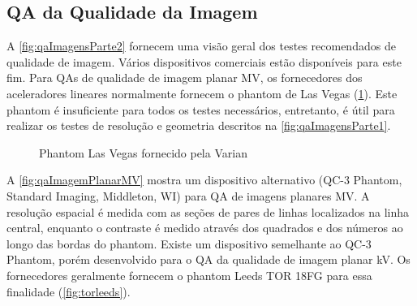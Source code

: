 \documentclass[11pt,a4paper]{article}
\begin{document}
\subsection*{QA da Qualidade da Imagem}

    A \ref{fig:qaImagensParte2} fornecem uma visão geral dos testes recomendados de qualidade de imagem. Vários dispositivos comerciais estão disponíveis para este fim. Para QAs de qualidade de imagem planar MV, os fornecedores dos aceleradores lineares normalmente fornecem o phantom de Las Vegas (\ref{fig:lasVegasPhantom}). Este phantom é insuficiente para todos os testes necessários, entretanto, é útil para realizar os testes de resolução e geometria descritos na \ref{fig:qaImagensParte1}.

    \begin{figure}[h]
        \centering
        \caption{Phantom Las Vegas fornecido pela Varian}
        \label{fig:lasVegasPhantom}
    \end{figure}

    A \ref{fig:qaImagemPlanarMV} mostra um dispositivo alternativo (QC-3 Phantom, Standard Imaging, Middleton, WI) para QA de imagens planares MV. A resolução espacial é medida com as seções de pares de linhas localizados na linha central, enquanto o contraste é medido através dos quadrados e dos números ao longo das bordas do phantom. Existe um dispositivo semelhante ao QC-3 Phantom, porém desenvolvido para o QA da qualidade de imagem planar kV. Os fornecedores geralmente fornecem o phantom Leeds TOR 18FG para essa finalidade (\ref{fig:torleeds}).
\end{document}
